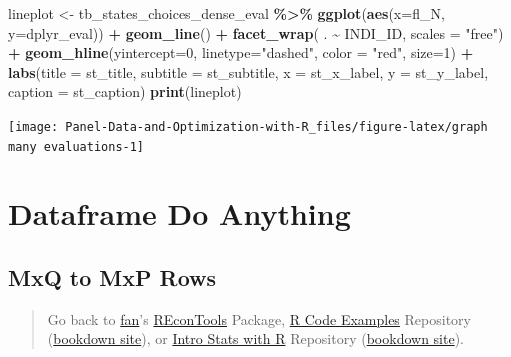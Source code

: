 \documentclass[
]{book}
\newenvironment{Shaded}{\begin{snugshade}}{\end{snugshade}}
\newcommand{\DataTypeTok}[1]{\textcolor[rgb]{0.13,0.29,0.53}{#1}}
\newcommand{\DecValTok}[1]{\textcolor[rgb]{0.00,0.00,0.81}{#1}}
\newcommand{\KeywordTok}[1]{\textcolor[rgb]{0.13,0.29,0.53}{\textbf{#1}}}
\newcommand{\NormalTok}[1]{#1}
\newcommand{\OperatorTok}[1]{\textcolor[rgb]{0.81,0.36,0.00}{\textbf{#1}}}
\newcommand{\StringTok}[1]{\textcolor[rgb]{0.31,0.60,0.02}{#1}}
\begin{document}
\begin{Shaded}
\begin{Highlighting}[]
\NormalTok{lineplot \textless{}{-}}\StringTok{ }\NormalTok{tb\_states\_choices\_dense\_eval }\OperatorTok{\%\textgreater{}\%}
\StringTok{    }\KeywordTok{ggplot}\NormalTok{(}\KeywordTok{aes}\NormalTok{(}\DataTypeTok{x=}\NormalTok{fl\_N, }\DataTypeTok{y=}\NormalTok{dplyr\_eval)) }\OperatorTok{+}
\StringTok{        }\KeywordTok{geom\_line}\NormalTok{() }\OperatorTok{+}
\StringTok{        }\KeywordTok{facet\_wrap}\NormalTok{( . }\OperatorTok{\textasciitilde{}}\StringTok{ }\NormalTok{INDI\_ID, }\DataTypeTok{scales =} \StringTok{"free"}\NormalTok{) }\OperatorTok{+}
\StringTok{        }\KeywordTok{geom\_hline}\NormalTok{(}\DataTypeTok{yintercept=}\DecValTok{0}\NormalTok{, }\DataTypeTok{linetype=}\StringTok{"dashed"}\NormalTok{,}
                \DataTypeTok{color =} \StringTok{"red"}\NormalTok{, }\DataTypeTok{size=}\DecValTok{1}\NormalTok{) }\OperatorTok{+}
\StringTok{        }\KeywordTok{labs}\NormalTok{(}\DataTypeTok{title =}\NormalTok{ st\_title,}
             \DataTypeTok{subtitle =}\NormalTok{ st\_subtitle,}
             \DataTypeTok{x =}\NormalTok{ st\_x\_label,}
             \DataTypeTok{y =}\NormalTok{ st\_y\_label,}
             \DataTypeTok{caption =}\NormalTok{ st\_caption)}
\KeywordTok{print}\NormalTok{(lineplot)}
\end{Highlighting}
\end{Shaded}

\begin{center}\texttt{[image: Panel-Data-and-Optimization-with-R\_files/figure-latex/graph many evaluations-1]} \end{center}

\hypertarget{dataframe-do-anything}{%
\section{Dataframe Do Anything}\label{dataframe-do-anything}}

\hypertarget{mxq-to-mxp-rows}{%
\subsection{MxQ to MxP Rows}\label{mxq-to-mxp-rows}}

\begin{quote}
Go back to \href{http://fanwangecon.github.io/}{fan}'s \href{https://fanwangecon.github.io/REconTools/}{REconTools} Package, \href{https://fanwangecon.github.io/R4Econ/}{R Code Examples} Repository (\href{https://fanwangecon.github.io/R4Econ/bookdown}{bookdown site}), or \href{https://fanwangecon.github.io/Stat4Econ/}{Intro Stats with R} Repository (\href{https://fanwangecon.github.io/Stat4Econ/bookdown}{bookdown site}).
\end{quote}
\end{document}
